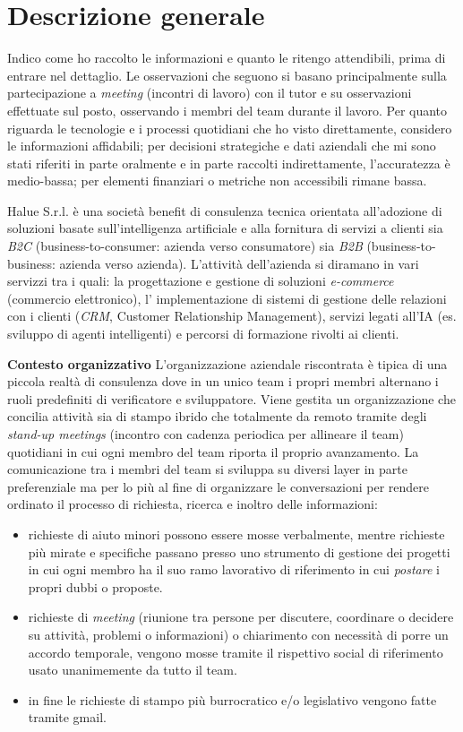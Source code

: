 \section{Descrizione generale}

Indico come ho raccolto le informazioni e quanto le ritengo attendibili, prima di entrare nel dettaglio. Le osservazioni che seguono si basano principalmente sulla partecipazione 
a \emph{meeting} (incontri di lavoro) con il tutor e su osservazioni effettuate sul posto, osservando i membri del team durante il lavoro. 
Per quanto riguarda le tecnologie e i processi quotidiani che ho visto direttamente, considero le informazioni affidabili; per decisioni strategiche e dati aziendali che mi sono 
stati riferiti in parte oralmente e in parte raccolti indirettamente, l'accuratezza è medio-bassa; per elementi finanziari o metriche non accessibili rimane bassa.

Halue S.r.l. è una società benefit di consulenza tecnica orientata all'adozione di soluzioni basate sull'intelligenza artificiale e alla fornitura di servizi a clienti sia 
\emph{B2C} (business-to-consumer: azienda verso consumatore) sia \emph{B2B} (business-to-business: azienda verso azienda). 
L'attività dell'azienda si diramano in vari servizzi tra i quali: la progettazione e gestione di soluzioni \emph{e-commerce} (commercio elettronico), l' implementazione di sistemi di 
gestione delle relazioni con i clienti (\emph{CRM}, Customer Relationship Management), servizi legati all'IA (es. sviluppo di agenti intelligenti) 
e percorsi di formazione rivolti ai clienti.

\medskip
\noindent\textbf{Contesto organizzativo}
L'organizzazione aziendale riscontrata è tipica di una piccola realtà di consulenza dove in un unico team i propri membri alternano i ruoli predefiniti di verificatore e sviluppatore.
Viene gestita un organizzazione che concilia attività sia di stampo ibrido che totalmente da remoto tramite degli \emph{stand-up meetings} (incontro con cadenza periodica per allineare il team) quotidiani in cui ogni membro del team riporta il proprio avanzamento.
La comunicazione tra i membri del team si sviluppa su diversi layer in parte preferenziale ma per lo più al fine di organizzare le conversazioni per rendere ordinato il processo di richiesta, ricerca e inoltro delle informazioni:

\begin{itemize}
\item richieste di aiuto minori possono essere mosse verbalmente, mentre richieste più mirate e specifiche passano presso uno strumento di gestione dei progetti in cui ogni membro ha il suo ramo lavorativo di riferimento in cui \emph{postare}
i propri dubbi o proposte.
\item richieste di \emph{meeting} (riunione tra persone per discutere, coordinare o decidere su attività, problemi o informazioni) o chiarimento con necessità di porre un accordo temporale, vengono mosse tramite il rispettivo social di riferimento usato unanimemente da tutto il team.
\item in fine le richieste di stampo più burrocratico e/o legislativo vengono fatte tramite gmail.
\end{itemize}

